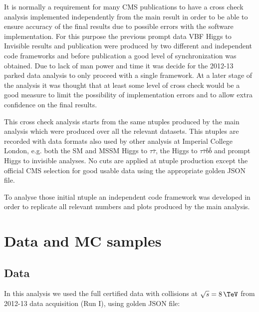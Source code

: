 
It is normally a requirement for many CMS publications to have a cross check analysis implemented independently from the main result in order to be able to ensure accuracy of the final results due to possible errors with the software implementation. For this purpose the previous prompt data \gls{VBF} Higgs to Invisible results and publication were produced by two different and independent code frameworks and before publication a good level of synchronization was obtained. Due to lack of man power and time it was decide for the 2012-13 parked data analysis to only proceed with a single framework. At a later stage of the analysis it was thought that at least some level of cross check would be a good measure to limit the possibility of implementation errors and to allow extra confidence on the final results.
 
This cross check analysis starts from the same ntuples produced by the main analysis which were produced over all the relevant datasets. This ntuples are recorded with data formats also used by other analysis at Imperial College London, e.g. both the \gls{SM} and \gls{MSSM} Higgs to $\tau\bar{\tau}$, the Higgs to $\tau\bar{\tau}b\bar{b}$ and prompt Higgs to invisible analyses. No cuts are applied at ntuple production except the official \gls{CMS} selection for good usable data using the appropriate golden \gls{JSON} file.
 
To analyse those initial ntuple an independent code framework was developed in order to replicate all relevant numbers and plots produced by the main analysis.


\section{Data and MC samples}

\subsection{Data}


In this analysis we used the full certified data with collisions at $\sqrt{s}=8\,\TeV$ from 2012-13 data acquisition (Run I), using golden \gls{JSON} file:

